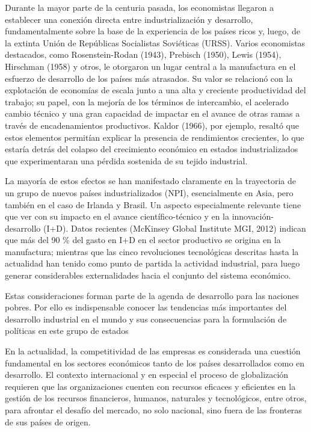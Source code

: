     Durante la mayor parte de la centuria pasada, los economistas llegaron a establecer una conexión directa entre industrialización y desarrollo, fundamentalmente sobre la base de la experiencia de los países ricos y, luego, de la extinta Unión de Repúblicas Socialistas Soviéticas (URSS). Varios economistas destacados, como Rosenstein-Rodan (1943), Prebisch (1950), Lewis (1954), Hirschman (1958) y otros, le otorgaron un lugar central a la manufactura en el esfuerzo de desarrollo de los países más atrasados. Su valor se relacionó con la explotación de economías de escala junto a una alta y creciente productividad del trabajo; su papel, con la mejoría de los términos de intercambio, el acelerado cambio técnico y una gran capacidad de impactar en el avance de otras ramas a través de encadenamientos productivos. Kaldor (1966), por ejemplo, resaltó que estos elementos permitían explicar la presencia de rendimientos crecientes, lo que estaría detrás del colapso del crecimiento económico en estados industrializados que experimentaran una pérdida sostenida de su tejido industrial. 
    
    
    
    La mayoría de estos efectos se han manifestado claramente en la trayectoria de un grupo de nuevos países industrializados (NPI), esencialmente en Asia, pero también en el caso de Irlanda y Brasil. Un aspecto especialmente relevante tiene que ver con su impacto en el avance científico-técnico y en la innovación-desarrollo (I+D). Datos recientes (McKinsey Global Institute MGI, 2012) indican que más del 90 \% del gasto en I+D en el sector productivo se origina en la manufactura; mientras que las cinco revoluciones tecnológicas descritas hasta la actualidad han tenido como punto de partida la actividad industrial, para luego generar considerables externalidades hacia el conjunto del sistema económico.
    
    Estas consideraciones forman parte de la agenda de desarrollo para las naciones pobres. Por ello es indispensable conocer las tendencias más importantes del desarrollo industrial en el mundo y sus consecuencias para la formulación de políticas en este grupo de estados
    
    
        En la actualidad, la competitividad de las empresas es considerada una cuestión fundamental en los sectores económicos tanto de los países desarrollados como en desarrollo. El contexto internacional y en especial el proceso de globalización requieren que las organizaciones cuenten con recursos eficaces y eficientes en la gestión de los recursos financieros, humanos, naturales y tecnológicos, entre otros, para afrontar el desafío del mercado, no solo nacional, sino fuera de las fronteras de sus países de origen. \cite{labarca2007consideraciones}
        
